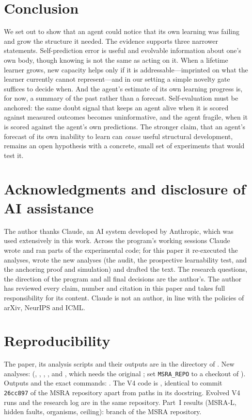 \documentclass[11pt]{article}
\theoremstyle{remark}
\begin{document}
\section{Conclusion}
We set out to show that an agent could notice that its own learning was failing and grow the structure it needed.
The evidence supports three narrower statements. Self-prediction error is useful and evolvable information about
one's own body, though knowing is not the same as acting on it. When a lifetime learner grows, new capacity helps
only if it is addressable---imprinted on what the learner currently cannot represent---and in our setting a simple
novelty gate suffices to decide when. And the agent's estimate of its own learning progress is, for now, a
summary of the past rather than a forecast. Self-evaluation must be anchored: the same doubt signal that keeps an agent alive when it is scored against
measured outcomes becomes uninformative, and the agent fragile, when it is scored against the agent's own
predictions. The stronger claim, that an agent's forecast of its own inability to
learn can \emph{cause} useful structural development, remains an open hypothesis with a concrete, small set of
experiments that would test it.

\section*{Acknowledgments and disclosure of AI assistance}
The author thanks Claude, an AI system developed by Anthropic, which was used extensively in this work. Across
the program's working sessions Claude wrote and ran parts of the experimental code; for this paper it
re-executed the analyses, wrote the new analyses (the  audit, the prospective learnability test, and
the anchoring proof and simulation) and drafted the text. The research questions, the direction of the program
and all final decisions are the author's. The author has reviewed every claim, number and citation in this paper
and takes full responsibility for its content. Claude is not an author, in line with the policies of arXiv,
NeurIPS and ICML.

\section*{Reproducibility}
The paper, its analysis scripts and their outputs are in the  directory of
. New analyses: 
(, , , , and
, which needs the original ; set \texttt{MSRA\_REPO} to a checkout of
). Outputs and the exact
commands: . The V4 code is , identical to
commit \texttt{26cc897} of the MSRA repository apart from paths in its docstring. Evolved V4 runs and the research
log are in the same repository. Part~I results (MSRA-L, hidden faults, organisms, ceiling): branch
 of the MSRA repository.
\end{document}
